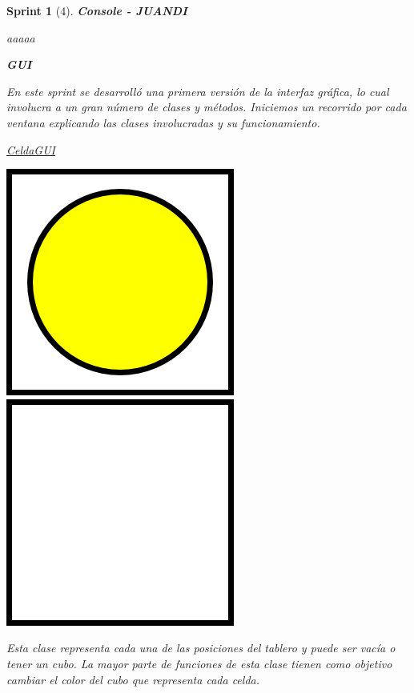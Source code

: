 \documentclass{article}
\theoremstyle{break}
\newtheorem*{sprint}{Sprint}
\begin{document}
\begin{sprint}[4]
\textbf{Console - JUANDI}

aaaaa

\textbf{GUI}

En este sprint se desarrolló una primera versión de la interfaz gráfica, lo cual involucra a un gran número de clases y métodos. Iniciemos un recorrido por cada ventana explicando las clases involucradas y su funcionamiento.

\underline{CeldaGUI}
\begin{center}
\includegraphics[scale=0.5]{yellowCube.png}
\includegraphics[scale=0.5]{emptyCell.png}
\end{center}

Esta clase representa cada una de las posiciones del tablero y puede ser vacía o tener un cubo. La mayor parte de funciones de esta clase  tienen como objetivo cambiar el color del cubo que representa cada celda.


\end{sprint}
\end{document}
